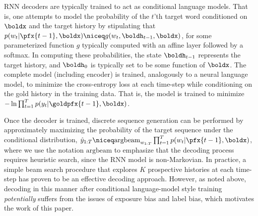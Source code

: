 




RNN decoders are typically trained to act as conditional language
models. That is, one attempts to model the probability of the $t$'th target
word conditioned on $\boldx$ and the target history by stipulating that $p(w_{t} | \pfx{t-1}, \boldx) \niceq g(w_{t},
\boldh_{t-1}, \boldx)$, for some parameterized function $g$ typically computed with an affine layer followed by a softmax. In computing these probabilities, the state $\boldh_{t-1}$ represents the target history, and $\boldh_0$ is typically set to be some function of $\boldx$. The complete model (including encoder) is trained,
analogously to a neural language model, to minimize the cross-entropy
loss at each time-step while conditioning on the gold history in the
training data. That is, the model is trained to minimize $-\ln \prod_{t=1}^{T} p(y_{t} |\goldpfx{t-1}, \boldx)$.

Once the decoder is trained, discrete sequence generation can be
performed by approximately maximizing the probability of the target
sequence under the conditional distribution,
$\hat{y}_{1:T} \niceq \mathrm{argbeam}_{w_{1:T}} \prod_{t=1}^{T} p(w_t |\pfx{t-1}, \boldx)$, where we use the notation $\mathrm{argbeam}$ to emphasize that the decoding process requires heuristic search, since the RNN model is non-Markovian. In practice, a simple beam search
procedure that explores $K$ prospective histories at each time-step
has proven to be an effective decoding approach. However, as noted above,
decoding in this manner after conditional language-model style training \textit{potentially} suffers from the issues of exposure bias and label bias, which motivates the work of this paper.

